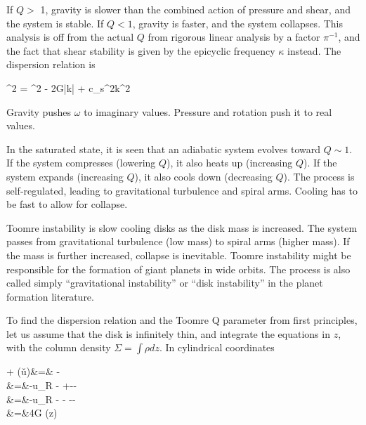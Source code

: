 If $Q >$ 1, gravity is slower than the combined action of pressure and shear, and the system is stable. If $Q<1$, gravity is faster, and the
system collapses. This analysis is off from the actual $Q$ from rigorous linear analysis by a factor $\pi^{-1}$, and the fact that shear stability is
given by the epicyclic frequency $\kappa$ instead. The dispersion
relation is

\beq
\omega^2 = \kappa^2 - 2\pi G\Sigma|k| + c_s^2k^2
\eeq

Gravity pushes $\omega$ to imaginary values. Pressure and rotation push it to real values.

In the saturated state, it is seen that an adiabatic system evolves
toward $Q\sim 1$. If the system compresses (lowering $Q$), it also
heats up (increasing $Q$). If the system expands (increasing $Q$), it
also cools down (decreasing $Q$). The process is self-regulated,
leading to gravitational turbulence and spiral arms.
Cooling has to be fast to allow for collapse.

Toomre instability is slow cooling disks as the disk mass is increased.
The system passes from gravitational turbulence (low mass) to spiral arms (higher mass).
If the mass is further increased, collapse is inevitable. Toomre instability might be responsible for the
formation of giant planets in wide orbits. The process is also called simply “gravitational
instability” or “disk instability” in the planet formation literature.

To find the dispersion relation and the Toomre Q parameter from first
principles, let us assume that the disk is infinitely thin, and
integrate the equations in $z$, with the column density $\Sigma = \int
\rho dz$. In cylindrical coordinates 

\beqn
{} + \left(\v{u}\cdot\del\right)\varSigma &=& -\varSigma{}\\
 &=&-u_R  -  +--\\
 &=&-u_R  -  - --\frac{\partial \varPhi}{\partial \phi}\\
\Laplace{\varPhi}&=&4\pi G \varSigma\delta(z)
\eeqn

